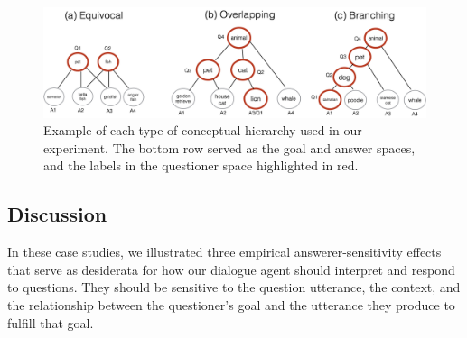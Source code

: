 \documentclass[12pt, floatsintext, jou]{apa6}
\begin{document}

\begin{figure}[t!]
\begin{center}
\includegraphics[scale = .35]{hierarchyStructureExamples.png}
\end{center}
\caption{Example of each type of conceptual hierarchy used in our experiment. The bottom row served as the goal and answer spaces, and the labels in the questioner space highlighted in red.}
\label{fig:hierarchyStructures}
\end{figure}


\subsection{Discussion}

In these case studies, we illustrated three empirical answerer-sensitivity effects that serve as desiderata for how our dialogue agent should interpret and respond to questions. They should be sensitive to the question utterance, the context, and the relationship between the questioner's goal and the utterance they produce to fulfill that goal.
\end{document}
